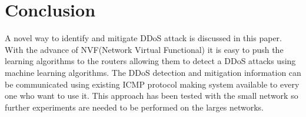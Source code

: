 \documentclass[12pt,oneside,a4paper]{article}
\begin{document}
\section{Conclusion}
A novel way to identify and mitigate DDoS attack is discussed in this paper. With the advance of NVF(Network Virtual Functional) it is easy to push the learning algorithms to the routers allowing them to detect a DDoS attacks using machine learning algorithms. The DDoS detection and mitigation information can be communicated using existing ICMP protocol making system available to every one who want to use it. This approach has been tested with the small network so further experiments are needed to be performed on the larges networks.
\pagebreak

\singlespacing
\end{document}
